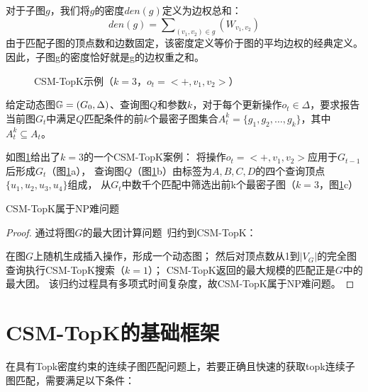     \begin{definition}[子图密度]\label{def:subgraph-density}

    对于子图$g$，我们将$g$的密度$den(g)$定义为边权总和：
    \[
        den(g) = \sum\nolimits_{(v_1,v_2)\in g}\left(W_{v_1,v_2}\right)
    \]
    由于匹配子图的顶点数和边数固定，该密度定义等价于图的平均边权的经典定义。
    因此，子图g的密度恰好就是g的边权重之和。
    \end{definition}
    
    \begin{figure}[h!]
        \centering
        \caption{CSM-TopK示例（$k=3$，$o_t=<+,v_{1},v_{2}>$）}
        \label{fig:csm-topk}
    \end{figure}
    
    \begin{definition}\label{def:problem-definition}
    给定动态图$\mathbb{G}=(G_0, \Delta)$、查询图$Q$和参数$k$，对于每个更新操作$o_t\in \Delta$，要求报告当前图$G_t$中满足$Q$匹配条件的前$k$个最密子图集合$A_{t}^k= \{g_1, g_2, \ldots, g_k\}$，其中$A_t^k\subseteq A_t$。
    \end{definition}
    
    如图\ref{fig:csm-topk}给出了$k=3$的一个CSM-TopK案例：
    将操作$o_t=<+,v_1, v_2>$应用于$G_{t-1}$后形成$G_t$（图\ref{fig:csm-topk}a），
    查询图$Q$（图\ref{fig:csm-topk}b）由标签为$A,B,C,D$的四个查询顶点$\{u_1, u_2, u_3, u_4\}$组成，
    从$G_t$中数千个匹配中筛选出前k个最密子图（$k=3$，图\ref{fig:csm-topk}c）
    
    \begin{theorem} \label{theorem:np-hard}
    CSM-TopK属于NP难问题
    \end{theorem}
    \begin{proof}
    通过将图$G$的最大团计算问题~\cite{clique-DBLP:journals/eor/WuH15}归约到CSM-TopK：
   
    在图$G$上随机生成插入操作，形成一个动态图；
    然后对顶点数从1到$|V_G|$的完全图查询执行CSM-TopK搜索（$k=1$）；
    CSM-TopK返回的最大规模的匹配正是$G$中的最大团。
    该归约过程具有多项式时间复杂度，故CSM-TopK属于NP难问题。
    \end{proof}
\section{CSM-TopK的基础框架}
\label{ch3:base-framework}
在具有Topk密度约束的连续子图匹配问题上，若要正确且快速的获取topk连续子图匹配，需要满足以下条件：

